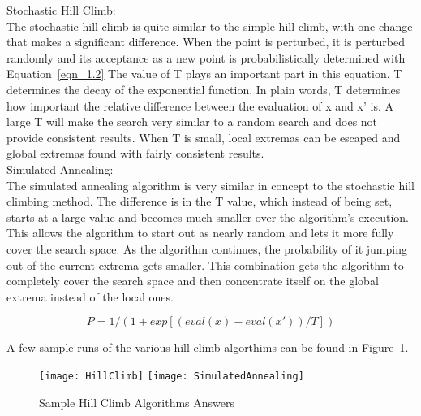 Stochastic Hill Climb: \\

The stochastic hill climb is quite similar to the simple hill climb, with one change that makes a significant difference. When the point is perturbed, it is perturbed randomly and its acceptance as a new point is probabilistically determined with Equation~\ref{eqn_1.2} The value of T plays an important part in this equation. T determines the decay of the exponential function. In plain words, T determines how important the relative difference between the evaluation of x and x' is. A large T will make the search very similar to a random search and does not provide consistent results. When T is small, local extremas can be escaped and global extremas found with fairly consistent results.  \\

Simulated Annealing: \\

The simulated annealing algorithm is very similar in concept to the stochastic hill climbing method. The difference is in the T value, which instead of being set, starts at a large value and becomes much smaller over the algorithm's execution. This allows the algorithm to start out as nearly random and lets it more fully cover the search space. As the algorithm continues, the probability of it jumping out of the current extrema gets smaller. This combination gets the algorithm to completely cover the search space and then concentrate itself on the global extrema instead of the local ones.

\begin{equation}\label{eqn_1.2}
P = 1 / ( 1 + exp[ ( eval(x) - eval(x') ) / T ] )
\end{equation}

A few sample runs of the various hill climb algorthims can be found in Figure~\ref{hill_climb}.


\begin{figure}[tbh]
\begin{center}
\texttt{[image: HillClimb]}
\hspace{20pt}
\texttt{[image: SimulatedAnnealing]}
\end{center}
\caption{Sample Hill Climb Algorithms Answers \label{hill_climb} }
\end{figure}


\newpage
